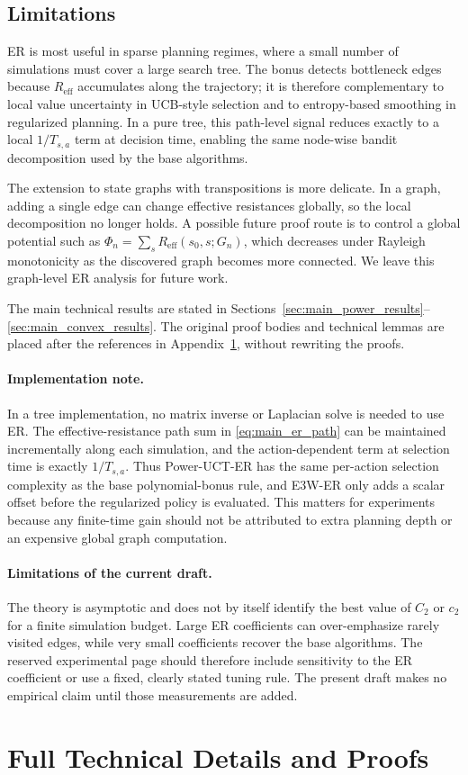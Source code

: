 \documentclass{article}
\newcommand{\Reff}{R_{\mathrm{eff}}}
\begin{document}
\subsection{Limitations}
\label{sec:main_discussion_structure}
ER is most useful in sparse planning regimes, where a small number of simulations must cover a large search tree.  The bonus detects bottleneck edges because $\Reff$ accumulates along the trajectory; it is therefore complementary to local value uncertainty in UCB-style selection and to entropy-based smoothing in regularized planning.  In a pure tree, this path-level signal reduces exactly to a local $1/T_{s,a}$ term at decision time, enabling the same node-wise bandit decomposition used by the base algorithms.

The extension to state graphs with transpositions is more delicate.  In a graph, adding a single edge can change effective resistances globally, so the local decomposition no longer holds.  A possible future proof route is to control a global potential such as $\Phi_n=\sum_s\Reff(s_0,s;G_n)$, which decreases under Rayleigh monotonicity as the discovered graph becomes more connected.  We leave this graph-level ER analysis for future work.

The main technical results are stated in Sections~\ref{sec:main_power_results}--\ref{sec:main_convex_results}. The original proof bodies and technical lemmas are placed after the references in Appendix~\ref{app:full}, without rewriting the proofs.

\paragraph{Implementation note.}
In a tree implementation, no matrix inverse or Laplacian solve is needed to use ER.  The effective-resistance path sum in \eqref{eq:main_er_path} can be maintained incrementally along each simulation, and the action-dependent term at selection time is exactly $1/T_{s,a}$.  Thus Power-UCT-ER has the same per-action selection complexity as the base polynomial-bonus rule, and E3W-ER only adds a scalar offset before the regularized policy is evaluated.  This matters for experiments because any finite-time gain should not be attributed to extra planning depth or an expensive global graph computation.

\paragraph{Limitations of the current draft.}
The theory is asymptotic and does not by itself identify the best value of $C_2$ or $c_2$ for a finite simulation budget.  Large ER coefficients can over-emphasize rarely visited edges, while very small coefficients recover the base algorithms.  The reserved experimental page should therefore include sensitivity to the ER coefficient or use a fixed, clearly stated tuning rule.  The present draft makes no empirical claim until those measurements are added.


\clearpage




\clearpage
\appendix

\section{Full Technical Details and Proofs}
\label{app:full}


\clearpage

\end{document}
